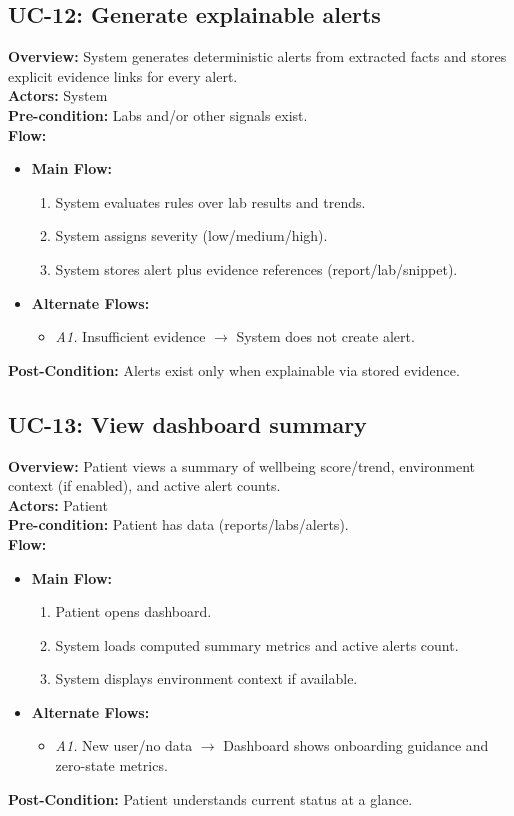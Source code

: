 \documentclass[12pt, a4paper]{article}
\begin{document}
\subsection*{UC-12: Generate explainable alerts}
\textbf{Overview:} System generates deterministic alerts from extracted facts and stores explicit evidence links for every alert. \\
\textbf{Actors:} System \\
\textbf{Pre-condition:} Labs and/or other signals exist. \\
\textbf{Flow:}
\begin{itemize}[leftmargin=*]
    \item \textbf{Main Flow:}
    \begin{enumerate}
        \item System evaluates rules over lab results and trends.
        \item System assigns severity (low/medium/high).
        \item System stores alert plus evidence references (report/lab/snippet).
    \end{enumerate}
    \item \textbf{Alternate Flows:}
    \begin{itemize}
        \item \textit{A1.} Insufficient evidence $\rightarrow$ System does not create alert.
    \end{itemize}
\end{itemize}
\textbf{Post-Condition:} Alerts exist only when explainable via stored evidence.

\subsection*{UC-13: View dashboard summary}
\textbf{Overview:} Patient views a summary of wellbeing score/trend, environment context (if enabled), and active alert counts. \\
\textbf{Actors:} Patient \\
\textbf{Pre-condition:} Patient has data (reports/labs/alerts). \\
\textbf{Flow:}
\begin{itemize}[leftmargin=*]
    \item \textbf{Main Flow:}
    \begin{enumerate}
        \item Patient opens dashboard.
        \item System loads computed summary metrics and active alerts count.
        \item System displays environment context if available.
    \end{enumerate}
    \item \textbf{Alternate Flows:}
    \begin{itemize}
        \item \textit{A1.} New user/no data $\rightarrow$ Dashboard shows onboarding guidance and zero-state metrics.
    \end{itemize}
\end{itemize}
\textbf{Post-Condition:} Patient understands current status at a glance.
\end{document}
